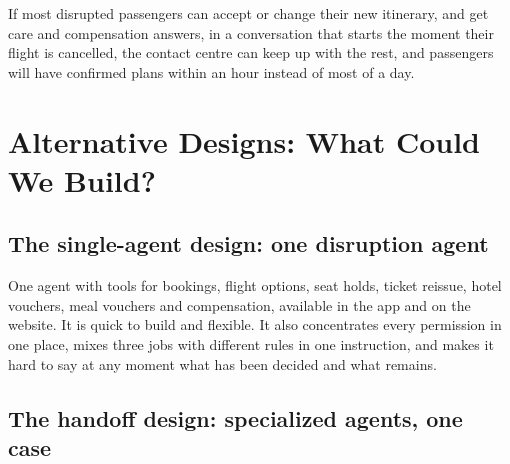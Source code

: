 \begin{keyidea}
If most disrupted passengers can accept or change their new itinerary, and get care and compensation answers, in a conversation that starts the moment their flight is cancelled, the contact centre can keep up with the rest, and passengers will have confirmed plans within an hour instead of most of a day.
\end{keyidea}

\section{Alternative Designs: What Could We Build?}
\label{sec:air-designs}

\subsection{The single-agent design: one disruption agent}

One agent with tools for bookings, flight options, seat holds, ticket reissue, hotel vouchers, meal vouchers and compensation, available in the app and on the website. It is quick to build and flexible. It also concentrates every permission in one place, mixes three jobs with different rules in one instruction, and makes it hard to say at any moment what has been decided and what remains.

\subsection{The handoff design: specialized agents, one case}

